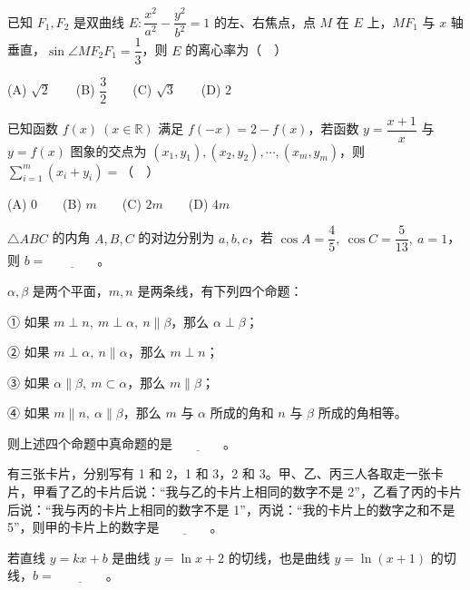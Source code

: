 \begin{question}
已知 \(F_1,F_2\) 是双曲线 \(E:\dfrac{x^2}{a^2}-\dfrac{y^2}{b^2}=1\) 的左、右焦点，点 \(M\) 在 \(E\) 上，\(MF_1\) 与 \(x\) 轴垂直，\(\sin\angle MF_2F_1=\dfrac13\)，则 \(E\) 的离心率为（　）

   (A) \(\sqrt2\)　　(B) \(\dfrac32\)　　(C) \(\sqrt3\)　　(D) \(2\)

\end{question}
\begin{question}
已知函数 \(f(x)\ (x\in\mathbb R)\) 满足 \(f(-x)=2-f(x)\)，若函数 \(y=\dfrac{x+1}{x}\) 与 \(y=f(x)\) 图象的交点为 \((x_1,y_1),(x_2,y_2),\cdots,(x_m,y_m)\)，则 \(\displaystyle\sum_{i=1}^m(x_i+y_i)=\)（　）

   (A) 0　　(B) \(m\)　　(C) \(2m\)　　(D) \(4m\)

\end{question}

\begin{question}
\(\triangle ABC\) 的内角 \(A,B,C\) 的对边分别为 \(a,b,c\)，若 \(\cos A=\dfrac45,\ \cos C=\dfrac5{13},\ a=1\)，则 \(b=\underline{\qquad\qquad}\)。

\end{question}
\begin{question}
\(\alpha,\beta\) 是两个平面，\(m,n\) 是两条线，有下列四个命题：

   ① 如果 \(m\perp n,\ m\perp\alpha,\ n\parallel\beta\)，那么 \(\alpha\perp\beta\)；

   ② 如果 \(m\perp\alpha,\ n\parallel\alpha\)，那么 \(m\perp n\)；

   ③ 如果 \(\alpha\parallel\beta,\ m\subset\alpha\)，那么 \(m\parallel\beta\)；

   ④ 如果 \(m\parallel n,\ \alpha\parallel\beta\)，那么 \(m\) 与 \(\alpha\) 所成的角和 \(n\) 与 \(\beta\) 所成的角相等。

   则上述四个命题中真命题的是\(\underline{\qquad\qquad}\)。

\end{question}
\begin{question}
有三张卡片，分别写有 1 和 2，1 和 3，2 和 3。甲、乙、丙三人各取走一张卡片，甲看了乙的卡片后说：“我与乙的卡片上相同的数字不是 2”，乙看了丙的卡片后说：“我与丙的卡片上相同的数字不是 1”，丙说：“我的卡片上的数字之和不是 5”，则甲的卡片上的数字是\(\underline{\qquad\qquad}\)。

\end{question}
\begin{question}
若直线 \(y=kx+b\) 是曲线 \(y=\ln x+2\) 的切线，也是曲线 \(y=\ln(x+1)\) 的切线，\(b=\underline{\qquad\qquad}\)。

\end{question}

